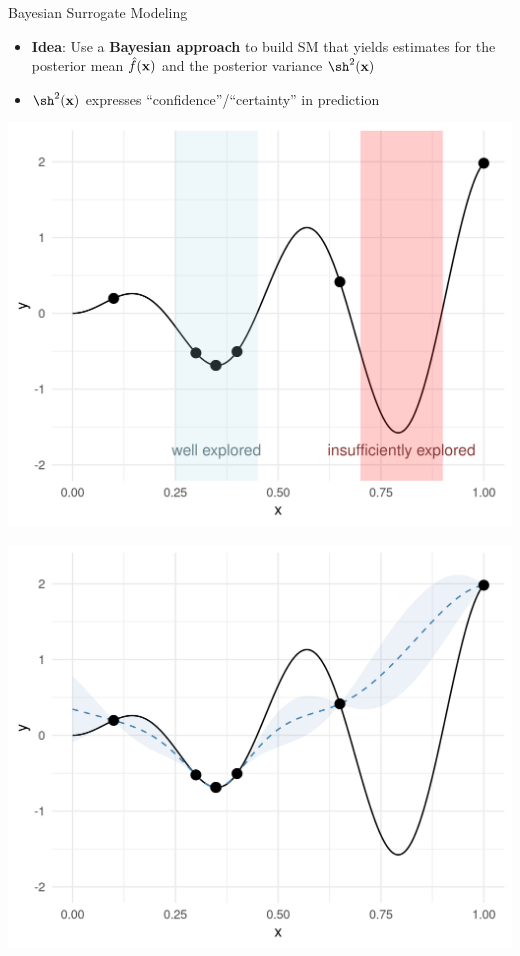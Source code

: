 \documentclass[11pt,compress,t,notes=noshow, xcolor=table]{beamer}
\begin{document}
\begin{vbframe}{Bayesian Surrogate Modeling}
\begin{itemize}
\item \textbf{Idea}: Use a \textbf{Bayesian approach} to build SM that yields estimates for the posterior mean $\hat{f}(\mathbf{x})$ and the posterior variance $\sh^2(\xv)$
\item  $\sh^2(\xv)$ expresses \enquote{confidence}/\enquote{certainty} in prediction
\end{itemize}
\vspace{+.45cm}
\begin{minipage}[b]{0.45\textwidth}
  \includegraphics[width = \textwidth]{figure_man/bayesian_loop_ee.png}
\end{minipage}
\hfill
\begin{minipage}[b]{0.45\textwidth}
  \includegraphics[width = \textwidth]{figure_man/bayesian_loop_sm.png}
\end{minipage}


\end{vbframe}
\end{document}
